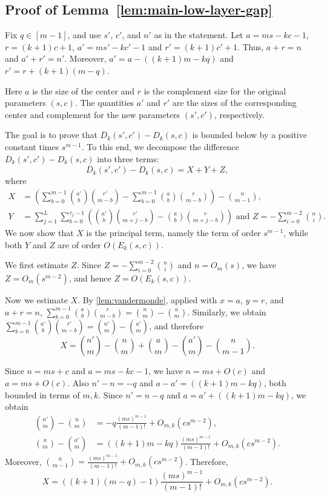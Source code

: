 \documentclass[10pt,a4paper]{article}
\numberwithin{equation}{section}
\theoremstyle{definition}
\begin{document}
\subsection{Proof of Lemma~\ref{lem:main-low-layer-gap}}\label{subsec:proofofclaim}


Fix $q\in[m-1]$, and use $s'$, $c'$, and $n'$ as in the statement.
Let $a=ms-kc-1$, $r=(k+1)c+1$, $a'=ms'-kc'-1$ and $r'=(k+1)c'+1$.
Thus, $a+r=n$ and $a'+r'=n'$.
Moreover, $a'=a-((k+1)m-kq)$ and $r'=r+(k+1)(m-q)$.

Here $a$ is the size of the center and $r$ is the complement size for the original parameters $(s,c)$.
The quantities $a'$ and $r'$ are the sizes of the corresponding center and complement for the new parameters $(s',c')$, respectively.

The goal is to prove that $\overline D_k(s',c')-D_k(s,c)$ is bounded below by a positive constant times $s^{m-1}$.
To this end, we decompose the difference $\overline D_k(s',c')-D_k(s,c)$ into three terms:
\[
        \overline D_k(s',c')-D_k(s,c)=X+Y+Z,
\]
where
\begin{align*}
        X
         & =
        \left(
        \sum_{b=0}^{m-1}
        \binom{a'}b\binom{r'}{m-b}
        -
        \sum_{b=0}^{m-1}
        \binom ab\binom r{m-b}
        \right)
        -
        \binom n{m-1}, \\
        Y
         & =
        \sum_{j=1}^{L}\sum_{b=0}^{\tau_j-1}
        \left(
        \binom{a'}b\binom{r'}{m+j-b}
        -
        \binom ab\binom r{m+j-b}
        \right) \text{ and }Z=
        -
        \sum_{i=0}^{m-2}\binom ni.
\end{align*}
We now show that $X$ is the principal term, namely the term of order $s^{m-1}$, while both $Y$ and $Z$ are of order $O(E_k(s,c))$.

We first estimate $Z$. Since $Z=-\sum_{i=0}^{m-2}\binom ni$ and $n=O_m(s)$, we have $Z=O_m(s^{m-2})$, and hence $Z=O(E_k(s,c))$.

Now we estimate $X$.
By \cref{lem:vandermonde}, applied with $x=a$, $y=r$, and $a+r=n$, $\sum_{b=0}^{m-1} \binom ab\binom r{m-b} = \binom nm-\binom am$.
Similarly, we obtain $\sum_{b=0}^{m-1} \binom{a'}b\binom{r'}{m-b} = \binom{n'}m-\binom{a'}m$, and therefore
\[
        X
        =
        \binom{n'}m-\binom nm
        +
        \binom am-\binom{a'}m
        -
        \binom n{m-1}.
\]

Since $n=ms+c$ and $a=ms-kc-1$, we have $n=ms+O(c)$ and $a=ms+O(c)$.
Also $n'-n=-q$ and $a-a'=((k+1)m-kq)$, both bounded in terms of $m,k$.
Since $n'=n-q$ and $a=a'+((k+1)m-kq)$, we obtain
\begin{align*}
        \binom{n'}m-\binom nm
         & =
        -q\frac{(ms)^{m-1}}{(m-1)!}
        +O_{m,k}(cs^{m-2}), \\
        \binom am-\binom{a'}m
         & =
        ((k+1)m-kq)\frac{(ms)^{m-1}}{(m-1)!}
        +O_{m,k}(cs^{m-2}).
\end{align*}
Moreover, $\binom n{m-1} = \frac{(ms)^{m-1}}{(m-1)!}+O_{m,k}(cs^{m-2})$.
Therefore,
\[
        X
        =
        \left((k+1)(m-q)-1\right)
        \frac{(ms)^{m-1}}{(m-1)!}
        +O_{m,k}(cs^{m-2}).
\]
\end{document}
